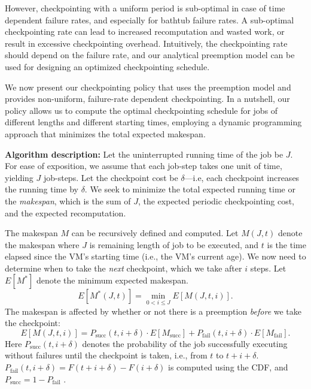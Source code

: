 However, checkpointing with a uniform period is sub-optimal in case of time dependent failure rates, and especially for bathtub failure rates. 
A sub-optimal checkpointing rate can lead to increased recomputation and wasted work, or result in excessive checkpointing overhead. 
Intuitively, the checkpointing rate should depend on the failure rate, and our analytical preemption model can be used for designing an optimized checkpointing schedule.

We now present our checkpointing policy that uses the preemption model and provides non-uniform, failure-rate dependent checkpointing.
In a nutshell, our policy allows us to compute the optimal checkpointing schedule for jobs of different lengths and different starting times, employing a dynamic programming approach that minimizes the total expected makespan. 


\noindent \textbf{Algorithm description:}
Let the uninterrupted running time of the job be $J$.
For ease of exposition, we assume that each job-step takes one unit of time, yielding $J$ job-steps. 
Let the checkpoint cost be $\delta$---i.e, each checkpoint increases the running time by $\delta$. 
We seek to minimize the total expected running time or the \emph{makespan}, which is the sum of $J$, the expected periodic checkpointing cost, and the expected recomputation. 

The makespan $M$ can be recursively defined and computed.
Let $M(J, t)$ denote the makespan where $J$ is remaining length of job to be executed, and $t$ is the time elapsed since the  VM's starting time (i.e., the VM's current age). 
We now need to determine when to take the \emph{next} checkpoint, which we take after $i$ steps. Let $E[M^*]$ denote the minimum expected makespan.
\begin{equation}
  \label{eq:m0}
  E[M^*(J, t)] = \min_{0<i\leq J}{E[M(J, t, i)]}.
\end{equation}
The makespan is affected by whether or not there is a preemption \emph{before} we take the checkpoint: 
\begin{equation}
  \label{eq:m1}
E[M(J, t, i)] = P_{\text{succ}}(t, i+\delta) \cdot E[M_{\text{succ}}] + P_{\text{fail}}(t, i+\delta) \cdot E[M_{\text{fail}}].
\end{equation}
Here $P_{\text{succ}}(t, i+\delta)$ denotes the probability of the job successfully executing without failures until the checkpoint is taken, i.e., from $t$ to $t+i+\delta$. $P_{\text{fail}}(t, i+\delta) = F(t+i+\delta)-F(i+\delta)$ is computed using the CDF, 
and $P_{\text{succ}} = 1 - P_{\text{fail}}$ .


